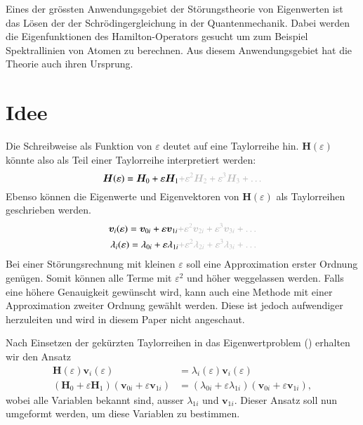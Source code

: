 Eines der grössten Anwendungsgebiet der Störungstheorie von Eigenwerten ist das Lösen der der Schrödingergleichung in der Quantenmechanik.
Dabei werden die Eigenfunktionen des Hamilton-Operators gesucht um zum Beispiel Spektrallinien von Atomen zu berechnen.
Aus diesem Anwendungsgebiet hat die Theorie auch ihren Ursprung. %

\section{Idee}

Die Schreibweise als Funktion von $\varepsilon$ deutet auf eine Taylorreihe hin.
$\bm H(\varepsilon)$ könnte also als Teil einer Taylorreihe interpretiert werden:
\begin{equation*}
    \bm H(\varepsilon) = \bm H_0 + \varepsilon \bm H_1 \GR{ + \varepsilon^2 \bm H_2  + \varepsilon^3 \bm H_3 + \dots}
\end{equation*}
Ebenso können die Eigenwerte und Eigenvektoren von $\bm H(\varepsilon)$ als Taylorreihen geschrieben werden.
\begin{align}
    \bm v_i(\varepsilon) = \bm v_{0i} + \varepsilon \bm v_{1i} \GR{ + \varepsilon^2 \bm v_{2i}  + \varepsilon^3 \bm v_{3i} + \dots} \label{ew:eq:eigvec} \\
    \lambda_i(\varepsilon) = \lambda_{0i} + \varepsilon \lambda_{1i} \GR{ + \varepsilon^2 \lambda_{2i}  + \varepsilon^3 \lambda_{3i} + \dots}  \label{ew:eq:eigval}
\end{align}
Bei einer Störungsrechnung mit kleinen $\varepsilon$ soll eine Approximation erster Ordnung genügen.
Somit können alle Terme mit $\varepsilon^2$ und höher weggelassen werden.
Falls eine höhere Genauigkeit gewünscht wird, kann auch eine Methode mit einer Approximation zweiter Ordnung gewählt werden.
Diese ist jedoch aufwendiger herzuleiten und wird in diesem Paper nicht angeschaut.

Nach Einsetzen der gekürzten Taylorreihen in das Eigenwertproblem () erhalten wir den Ansatz
\begin{align}
    \bm H(\varepsilon) \bm v_i(\varepsilon)
    &=
    \lambda_i(\varepsilon) \bm v_i(\varepsilon) \\
    (\bm H_0 + \varepsilon \bm H_1)
    (\bm v_{0i} + \varepsilon \bm v_{1i})
    &=
    (\lambda_{0i} + \varepsilon \lambda_{1i})
    (\bm v_{0i} + \varepsilon \bm v_{1i}),
\end{align}
wobei alle Variablen bekannt sind, ausser $\lambda_{1i}$ und $\bm v_{1i}$.
Dieser Ansatz soll nun umgeformt werden, um diese Variablen zu bestimmen.

